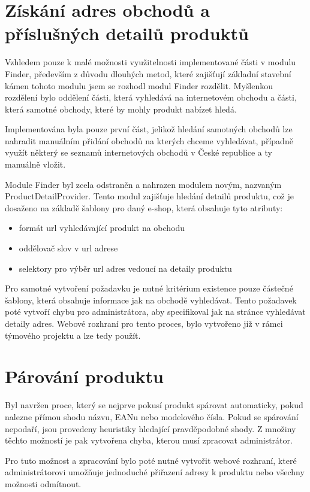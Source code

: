 \documentclass[thesis=B,czech]{FITthesis}[2012/06/26]
\begin{document}
\section{Získání adres obchodů a příslušných detailů produktů}
Vzhledem pouze k malé možnosti využitelnosti implementované části v modulu Finder, především z důvodu dlouhých metod, které zajišťují
základní stavební kámen tohoto modulu jsem se rozhodl modul Finder rozdělit. Myšlenkou rozdělení bylo oddělení části, která vyhledává na internetovém obchodu a části, která samotné obchody, které by mohly produkt nabízet hledá. 
\par
Implementována byla pouze první část, jelikož hledání samotných obchodů lze nahradit manuálním přidání obchodů na kterých chceme vyhledávat, případně 
využít některý se seznamů internetových obchodů v České republice a ty manuálně vložit.
\par
Module Finder byl zcela odstraněn a nahrazen modulem novým, nazvaným ProductDetailProvider.
Tento modul zajišťuje hledání detailů produktu, což je dosaženo na základě šablony pro daný e-shop, která obsahuje 
tyto atributy:
\begin{itemize}
\item formát url vyhledávající produkt na obchodu
\item oddělovač slov v url adrese
\item selektory pro výběr url adres vedoucí na detaily produktu
\end{itemize}
Pro samotné vytvoření požadavku je nutné kritérium existence pouze částečné šablony, která obsahuje informace jak na obchodě vyhledávat.
Tento požadavek poté vytvoří chybu pro administrátora, aby specifikoval jak na stránce vyhledávat detaily adres. Webové rozhraní
pro tento proces, bylo vytvořeno již v rámci týmového projektu a lze tedy použít.


\section{Párování produktu}
Byl navržen proce, který se nejprve pokusí produkt spárovat automaticky, pokud nalezne přímou shodu názvu, EANu nebo modelového čísla.
Pokud se spárování nepodaří, jsou provedeny heuristiky hledající pravděpodobné shody. Z množiny těchto možností je pak 
vytvořena chyba, kterou musí zpracovat administrátor.
\par
Pro tuto možnost a zpracování bylo poté nutné vytvořit webové rozhraní, které administrátorovi umožňuje jednoduché přiřazení 
adresy k produktu nebo všechny možnosti odmítnout.
\end{document}
